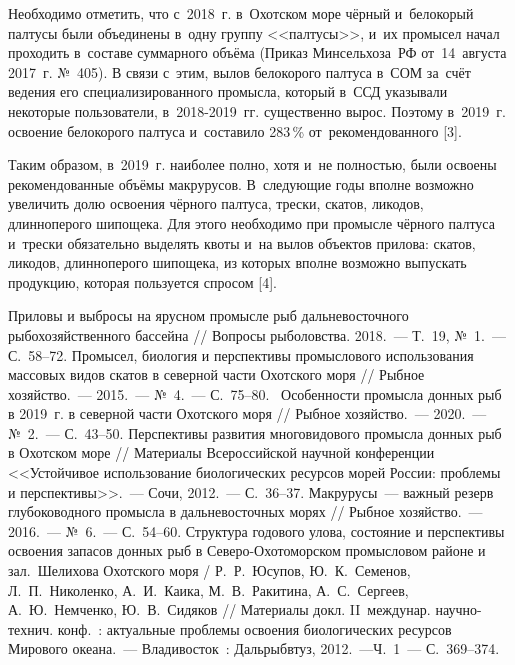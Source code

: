 Необходимо отметить, что с~2018~г. в~Охотском море чёрный и~белокорый палтусы были объединены в~одну группу <<палтусы>>, и~их промысел начал проходить в~составе суммарного объёма (Приказ Минсельхоза~РФ от~14~августа 2017~г. №~405). В связи с~этим, вылов белокорого палтуса в~СОМ за~счёт ведения его специализированного промысла, который в~ССД указывали некоторые пользователи, в~2018-2019~гг. существенно вырос. Поэтому в~2019~г. освоение белокорого палтуса и~составило 283\,\% от~рекомендованного [3].

Таким образом, в~2019~г. наиболее полно, хотя и~не полностью, были освоены рекомендованные объёмы макрурусов. В~следующие годы вполне возможно увеличить долю освоения чёрного палтуса, трески, скатов, ликодов, длинноперого шипощека. Для этого необходимо при промысле чёрного палтуса и~трески обязательно выделять квоты и~на вылов объектов прилова: скатов, ликодов, длинноперого шипощека, из которых вполне возможно выпускать продукцию, которая пользуется спросом [4].

\begin{thebibliography}{99}

\bibitem{}
 Приловы и выбросы на ярусном промысле рыб дальневосточного рыбохозяйственного бассейна // Вопросы рыболовства. 2018.~--- Т.~19, №~1.~--- С.~58--72.
\bibitem{}
 Промысел, биология и перспективы промыслового использования массовых видов скатов в северной части Охотского моря // Рыбное хозяйство.~--- 2015.~--- №~4.~--- С.~75--80.
\bibitem{}
 Особенности промысла донных рыб в 2019~г. в северной части Охотского моря // Рыбное хозяйство.~--- 2020.~--- №~2.~--- С.~43--50.
\bibitem{}
 Перспективы развития многовидового промысла донных рыб в Охотском море // Материалы Всероссийской научной конференции <<Устойчивое использование биологических ресурсов морей России: проблемы и перспективы>>.~--- Сочи, 2012.~--- С.~36--37.
\bibitem{}
 Макрурусы~--- важный резерв глубоководного промысла в дальневосточных морях // Рыбное хозяйство.~--- 2016.~--- №~6.~--- С.~54--60.
\bibitem{}
 Структура годового улова, состояние и перспективы освоения запасов донных рыб в Северо-Охотоморском промысловом районе и зал.~Шелихова Охотского моря / Р.~Р.~Юсупов, Ю.~К.~Семенов, Л.~П.~Николенко, А.~И.~Каика, М.~В.~Ракитина, А.~С.~Сергеев, А.~Ю.~Немченко, Ю.~В.~Сидяков // Материалы докл. II~междунар. научно-технич. конф.~: актуальные проблемы освоения биологических ресурсов Мирового океана.~--- Владивосток~: Дальрыбвтуз, 2012.~---Ч.~1~--- С.~369--374.
\end{thebibliography}
